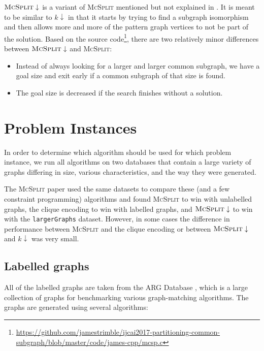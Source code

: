 \documentclass{article}
\theoremstyle{definition}
\begin{document}
$\textsc{McSplit} \downarrow$ is a variant of \textsc{McSplit} mentioned but not
explained in \cite{DBLP:conf/ijcai/McCreeshPT17}. It is meant to be similar to
$k\downarrow$ in that it starts by trying to find a subgraph isomorphism and
then allows more and more of the pattern graph vertices to not be part of the
solution. Based on the source
code\footnote{\url{https://github.com/jamestrimble/ijcai2017-partitioning-common-subgraph/blob/master/code/james-cpp/mcsp.c}},
there are two relatively minor differences between $\textsc{McSplit} \downarrow$
and \textsc{McSplit}:
\begin{itemize}
\item Instead of always looking for a larger and larger common subgraph, we have
  a goal size and exit early if a common subgraph of that size is found.
\item The goal size is decreased if the search finishes without a solution.
\end{itemize}

\section{Problem Instances}
In order to determine which algorithm should be used for which problem instance,
we run all algorithms on two databases that contain a large variety of graphs
differing in size, various characteristics, and the way they were generated.

The \textsc{McSplit} paper \cite{DBLP:conf/ijcai/McCreeshPT17} used the same
datasets to compare these (and a few constraint programming) algorithms and
found \textsc{McSplit} to win with unlabelled graphs, the clique encoding to
win with labelled graphs, and $\textsc{McSplit}\downarrow$ to win with the
\texttt{largerGraphs} dataset. However, in some cases the difference in
performance between \textsc{McSplit} and the clique encoding or between
$\textsc{McSplit}\downarrow$ and $k\downarrow$ was very small.


\subsection{Labelled graphs}
All of the labelled graphs are taken from the ARG Database \cite{DeSanto2003,
  foggia2001-2}, which is a large collection of graphs for benchmarking various
graph-matching algorithms. The graphs are generated using several algorithms:
\end{document}
